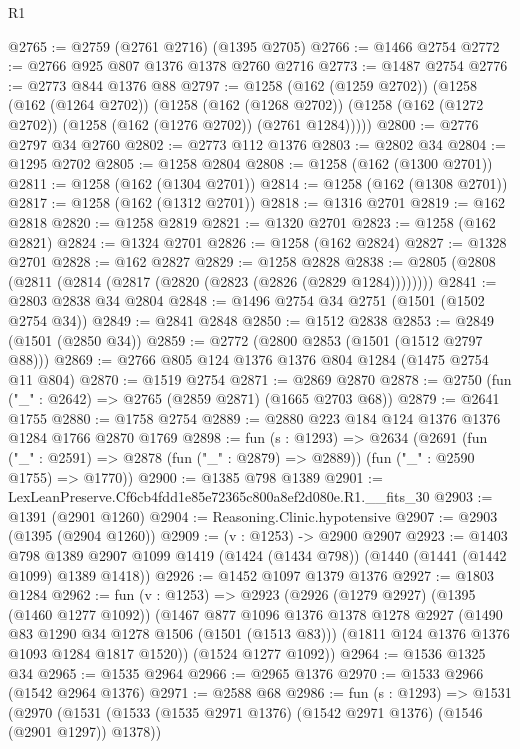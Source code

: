 \begin{lexlean}{R1}
\begin{coremodule}
@2765 := @2759 (@2761 @2716) (@1395 @2705)
@2766 := @1466 @2754
@2772 := @2766 @925 @807 @1376 @1378 @2760 @2716
@2773 := @1487 @2754
@2776 := @2773 @844 @1376 @88
@2797 := @1258
    (@162 (@1259 @2702))
    (@1258
      (@162 (@1264 @2702))
      (@1258
        (@162 (@1268 @2702))
        (@1258 (@162 (@1272 @2702)) (@1258 (@162 (@1276 @2702)) (@2761 @1284)))))
@2800 := @2776 @2797 @34 @2760
@2802 := @2773 @112 @1376
@2803 := @2802 @34
@2804 := @1295 @2702
@2805 := @1258 @2804
@2808 := @1258 (@162 (@1300 @2701))
@2811 := @1258 (@162 (@1304 @2701))
@2814 := @1258 (@162 (@1308 @2701))
@2817 := @1258 (@162 (@1312 @2701))
@2818 := @1316 @2701
@2819 := @162 @2818
@2820 := @1258 @2819
@2821 := @1320 @2701
@2823 := @1258 (@162 @2821)
@2824 := @1324 @2701
@2826 := @1258 (@162 @2824)
@2827 := @1328 @2701
@2828 := @162 @2827
@2829 := @1258 @2828
@2838 := @2805 (@2808 (@2811 (@2814 (@2817 (@2820 (@2823 (@2826 (@2829 @1284))))))))
@2841 := @2803 @2838 @34 @2804
@2848 := @1496 @2754 @34 @2751 (@1501 (@1502 @2754 @34))
@2849 := @2841 @2848
@2850 := @1512 @2838
@2853 := @2849 (@1501 (@2850 @34))
@2859 := @2772 (@2800 @2853 (@1501 (@1512 @2797 @88)))
@2869 := @2766 @805 @124 @1376 @1376 @804 @1284 (@1475 @2754 @11 @804)
@2870 := @1519 @2754
@2871 := @2869 @2870
@2878 := @2750 (fun ("_" : @2642) => @2765 (@2859 @2871) (@1665 @2703 @68))
@2879 := @2641 @1755
@2880 := @1758 @2754
@2889 := @2880 @223 @184 @124 @1376 @1376 @1284 @1766 @2870 @1769
@2898 := fun (s : @1293) =>
  @2634
    (@2691
      (fun ("_" : @2591) => @2878 (fun ("_" : @2879) => @2889))
      (fun ("_" : @2590 @1755) => @1770))
@2900 := @1385 @798 @1389
@2901 := LexLeanPreserve.Cf6cb4fdd1e85e72365c800a8ef2d080e.R1.__fits_30
@2903 := @1391 (@2901 @1260)
@2904 := Reasoning.Clinic.hypotensive
@2907 := @2903 (@1395 (@2904 @1260))
@2909 := (v : @1253) -> @2900 @2907
@2923 := @1403
    @798
    @1389
    @2907
    @1099
    @1419
    (@1424 (@1434 @798))
    (@1440 (@1441 (@1442 @1099) @1389 @1418))
@2926 := @1452 @1097 @1379 @1376
@2927 := @1803 @1284
@2962 := fun (v : @1253) =>
  @2923
    (@2926
      (@1279 @2927)
      (@1395 (@1460 @1277 @1092))
      (@1467
        @877
        @1096
        @1376
        @1378
        @1278
        @2927
        (@1490 @83 @1290 @34 @1278 @1506 (@1501 (@1513 @83)))
        (@1811 @124 @1376 @1376 @1093 @1284 @1817 @1520))
      (@1524 @1277 @1092))
@2964 := @1536 @1325 @34
@2965 := @1535 @2964
@2966 := @2965 @1376
@2970 := @1533 @2966 (@1542 @2964 @1376)
@2971 := @2588 @68
@2986 := fun (s : @1293) =>
  @1531
    (@2970
      (@1531 (@1533 (@1535 @2971 @1376) (@1542 @2971 @1376) (@1546 (@2901 @1297)) @1378))

\end{coremodule}
\end{lexlean}
